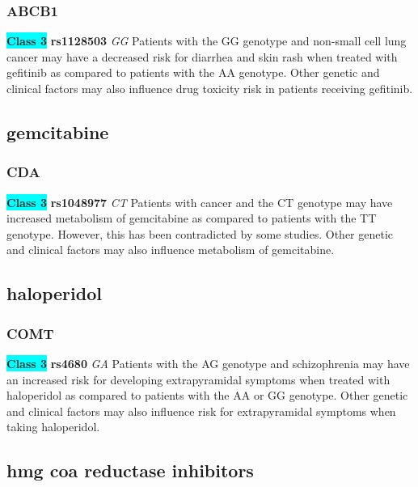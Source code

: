 \documentclass{book}
\begin{document}
\subsubsection{ ABCB1 }

\begin{center}
\textbf{\colorbox{cyan} {Class 3}} \textbf{ rs1128503 } \textit{ GG }
Patients with the GG genotype and non-small cell lung cancer may have a decreased risk for diarrhea and skin rash when treated with gefitinib as compared to patients with the AA genotype. Other genetic and clinical factors may also influence drug toxicity risk in patients receiving gefitinib.


\end{center}\subsection{ gemcitabine }


\subsubsection{ CDA }

\begin{center}
\textbf{\colorbox{cyan} {Class 3}} \textbf{ rs1048977 } \textit{ CT }
Patients with cancer and the CT genotype may have increased metabolism of gemcitabine as compared to patients with the TT genotype. However, this has been contradicted by some studies. Other genetic and clinical factors may also influence metabolism of gemcitabine. 


\end{center}\subsection{ haloperidol }


\subsubsection{ COMT }

\begin{center}
\textbf{\colorbox{cyan} {Class 3}} \textbf{ rs4680 } \textit{ GA }
Patients with the AG genotype and schizophrenia may have an increased risk for developing extrapyramidal symptoms when treated with haloperidol as compared to patients with the AA or GG genotype. Other genetic and clinical factors may also influence risk for extrapyramidal symptoms when taking haloperidol.


\end{center}\subsection{ hmg coa reductase inhibitors }
\end{document}
